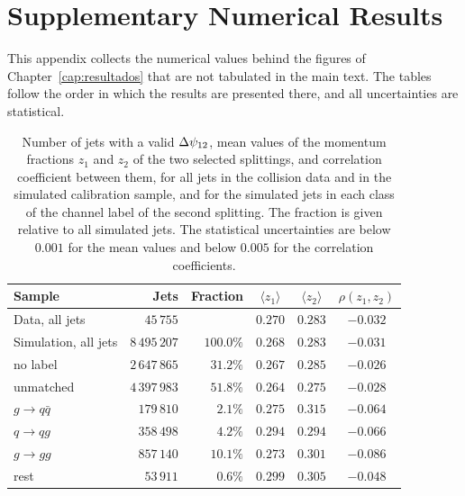 \chapter{Supplementary Numerical Results}
\label{anexo:b}

This appendix collects the numerical values behind the figures of
Chapter~\ref{cap:resultados} that are not tabulated in the main text. The tables
follow the order in which the results are presented there, and all uncertainties
are statistical.

\begin{table}[htbp]
  \centering
  \caption{Number of jets with a valid $\Delta\psi_{12}$, mean values of the momentum
  fractions $z_1$ and $z_2$ of the two selected splittings, and correlation
  coefficient between them, for all jets in the collision data and in the
  simulated calibration sample, and for the simulated jets in each class of the
  channel label of the second splitting. The fraction is given relative to all
  simulated jets. The statistical uncertainties are below $0.001$ for the mean
  values and below $0.005$ for the correlation coefficients.}
  \label{tab:zplane}
  \begin{tabular}{lrrccc}
    \toprule
    Sample & Jets & Fraction & $\langle z_1 \rangle$ & $\langle z_2 \rangle$ & $\rho(z_1, z_2)$ \\
    \midrule
    Data, all jets & $45\,755$ & & $0.270$ & $0.283$ & $-0.032$ \\
    \midrule
    Simulation, all jets & $8\,495\,207$ & $100.0\%$ & $0.268$ & $0.283$ & $-0.031$ \\
    \quad no label & $2\,647\,865$ & $31.2\%$ & $0.267$ & $0.285$ & $-0.026$ \\
    \quad unmatched & $4\,397\,983$ & $51.8\%$ & $0.264$ & $0.275$ & $-0.028$ \\
    \quad $g \to q\bar{q}$ & $179\,810$ & $2.1\%$ & $0.275$ & $0.315$ & $-0.064$ \\
    \quad $q \to qg$ & $358\,498$ & $4.2\%$ & $0.294$ & $0.294$ & $-0.066$ \\
    \quad $g \to gg$ & $857\,140$ & $10.1\%$ & $0.273$ & $0.301$ & $-0.086$ \\
    \quad rest & $53\,911$ & $0.6\%$ & $0.299$ & $0.305$ & $-0.048$ \\
    \bottomrule
  \end{tabular}
\end{table}

